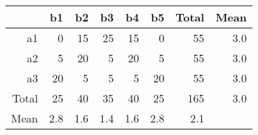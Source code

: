  \begin{center}
 \begin{tabular}{r|rrrrr|rr}
  \hline
   & b1 & b2 & b3 & b4 & b5 & Total & Mean \\ 
  \hline
  a1 & 0 & 15 & 25 & 15 & 0 & 55 & 3.0 \\ 
  a2 & 5 & 20 & 5 & 20 & 5 & 55 & 3.0 \\ 
  a3 & 20 & 5 & 5 & 5 & 20 & 55 & 3.0 \\ 
  \hline
  Total & 25 & 40 & 35 & 40 & 25 & 165 & 3.0\\ 
  Mean & 2.8 & 1.6 & 1.4 & 1.6 & 2.8 & 2.1\\
  \hline
 \end{tabular}
 \end{center}

